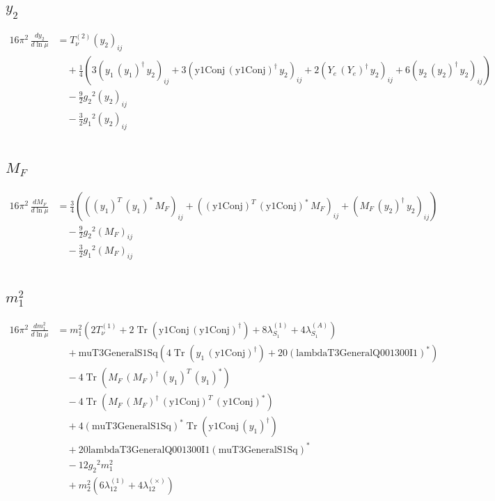 \documentclass[10pt,a4paper]{article}
\begin{document}
\subsection*{$y_2$}
\begin{align*}
16\pi^2\,\frac{d y_2}{d\ln\mu} &=T_{\nu}^{(2)} \left({y_2}\right)_{ij} \\
&\quad +\frac{1}{4} (3 \left({y_1}\,\left({y_1}\right)^{\dagger}\,{y_2}\right)_{ij}+3 \left(\text{y1Conj}\,\left(\text{y1Conj}\right)^{\dagger}\,{y_2}\right)_{ij}+2 \left({Y_e}\,\left({Y_e}\right)^{\dagger}\,{y_2}\right)_{ij}+6 \left({y_2}\,\left({y_2}\right)^{\dagger}\,{y_2}\right)_{ij}) \\
&\quad -\frac{9}{2} {g_2}^2 \left({y_2}\right)_{ij} \\
&\quad -\frac{3}{2} {g_1}^2 \left({y_2}\right)_{ij} \\
\end{align*}
\subsection*{$M_F$}
\begin{align*}
16\pi^2\,\frac{d M_F}{d\ln\mu} &=\frac{3}{4} (\left(\left({y_1}\right)^{T}\,\left({y_1}\right)^{*}\,{M_F}\right)_{ij}+\left(\left(\text{y1Conj}\right)^{T}\,\left(\text{y1Conj}\right)^{*}\,{M_F}\right)_{ij}+\left({M_F}\,\left({y_2}\right)^{\dagger}\,{y_2}\right)_{ij}) \\
&\quad -\frac{9}{2} {g_2}^2 \left({M_F}\right)_{ij} \\
&\quad -\frac{3}{2} {g_1}^2 \left({M_F}\right)_{ij} \\
\end{align*}
\subsection*{$m_1^2$}
\begin{align*}
16\pi^2\,\frac{d m_1^2}{d\ln\mu} &={m_1^2} (2 T_{\nu}^{(1)}+2 \operatorname{Tr}\!\left(\text{y1Conj}\,\left(\text{y1Conj}\right)^{\dagger}\right)+8 {\lambda_{S_1}^{(1)}}+4 {\lambda_{S_1}^{(A)}}) \\
&\quad +\text{muT3GeneralS1Sq} (4 \operatorname{Tr}\!\left({y_1}\,\left(\text{y1Conj}\right)^{\dagger}\right)+20 \left(\text{lambdaT3GeneralQ001300I1}\right)^{*}) \\
&\quad -4 \operatorname{Tr}\!\left({M_F}\,\left({M_F}\right)^{\dagger}\,\left({y_1}\right)^{T}\,\left({y_1}\right)^{*}\right) \\
&\quad -4 \operatorname{Tr}\!\left({M_F}\,\left({M_F}\right)^{\dagger}\,\left(\text{y1Conj}\right)^{T}\,\left(\text{y1Conj}\right)^{*}\right) \\
&\quad +4 \left(\text{muT3GeneralS1Sq}\right)^{*} \operatorname{Tr}\!\left(\text{y1Conj}\,\left({y_1}\right)^{\dagger}\right) \\
&\quad +20 \text{lambdaT3GeneralQ001300I1} \left(\text{muT3GeneralS1Sq}\right)^{*} \\
&\quad -12 {g_2}^2 {m_1^2} \\
&\quad +{m_2^2} (6 {\lambda_{12}^{(1)}}+4 {\lambda_{12}^{(\times)}}) \\
\end{align*}
\end{document}
